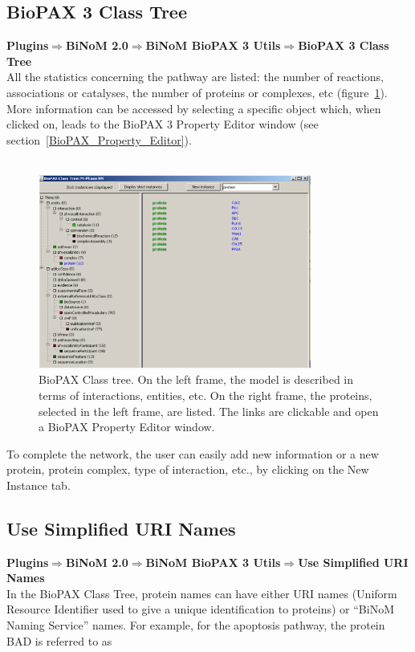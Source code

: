 \subsection{BioPAX 3 Class Tree}
\textbf{Plugins$\Rightarrow$BiNoM 2.0$\Rightarrow$BiNoM BioPAX 3 Utils$\Rightarrow$BioPAX 3 Class
Tree}\\
All the statistics concerning the pathway are listed: the number of reactions,
associations or catalyses, the number of proteins or complexes, etc
(figure~\ref{BioPAX_Class_Tree}). More information can be accessed by selecting
a specific object which, when clicked on, leads to the BioPAX 3 Property Editor
window (see section~\ref{BioPAX_Property_Editor}).\\\\
\begin{figure}[h]
\centering
\includegraphics[width=0.8\textwidth]{graphics/BioPAX_Class_Tree}
\caption{BioPAX Class tree. On the left frame, the model is described in terms
of interactions, entities, etc. On the right frame, the proteins, selected in
the left frame, are listed. The links are clickable and open a BioPAX Property
Editor window.}
\label{BioPAX_Class_Tree}
\end{figure}
To complete the network, the user can easily add new information or a new
protein, protein complex, type of interaction, etc., by clicking on the New
Instance tab.

\subsection{Use Simplified URI Names}
\textbf{Plugins$\Rightarrow$BiNoM 2.0$\Rightarrow$BiNoM BioPAX 3 Utils$\Rightarrow$Use Simplified URI Names}\\

In the BioPAX Class Tree, protein names can have either URI names (Uniform Resource Identifier used to give a unique identification to proteins) or “BiNoM Naming Service” names. For example, for the apoptosis pathway, the protein BAD is referred to as\\

